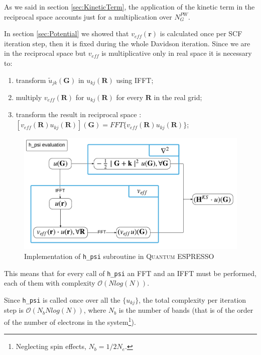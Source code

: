 \documentclass[a4paper,12pt]{article}
\newcommand\mf[1]{\mathbf{#1}}
\newcommand\erre{\mathbf{r}}
\newcommand\GI{\mathbf{G}}
\newcommand\QE{\textsc{Quantum} ESPRESSO }
\newcommand\bigO{\mathcal{O}}
\begin{document}
As we said in section \ref{sec:KineticTerm}, the application of the kinetic term in the reciprocal space accounts just for a multiplication over $N^{PW}_G$.

In section \ref{sec:Potential} we showed that $v_{eff}(\erre)$ is calculated once per SCF iteration step, then it is fixed during the whole Davidson iteration. Since we are in the reciprocal space but $v_{eff}$ is multiplicative only in real space it is necessary to: 
\begin{enumerate}
	\item transform $\tilde{u}_{jk}(\GI)$ in $u_{kj}(\mf{R})$ using IFFT;
	\item multiply $v_{eff}(\mf{R})$ for $u_{kj}(\mf{R})$ for every $\mf{R}$ in the real grid;
	\item transform the result in reciprocal space : \\ $[v_{eff}(\mf{R}) u_{kj}(\mf{R})](\GI) = FFT\{v_{eff}(\mf{R}) u_{kj}(\mf{R})\}$;
\end{enumerate}

\begin{figure}[h]
\begin{center}
	\begin{framed}
	\includegraphics[width=\linewidth]{h_psi.pdf}

	\end{framed}
\caption{Implementation of \texttt{h\_psi} subroutine in \QE}
	\label{fig:hpsi}
\end{center}
\end{figure}


This means that for every call of \texttt{h\_psi} an FFT and an IFFT must be performed, each of them with complexity $\bigO(N log (N))$. 

Since \texttt{h\_psi} is called once over all the $\{u_{kj}\}$, the total complexity per iteration step is $\bigO(N_{b} N log (N))$, where $N_{b}$ is the number of bands (that is of the order of the number of electrons in the system\footnote{Neglecting spin effects, $N_b = 1/2 N_e$.}). 
\end{document}
